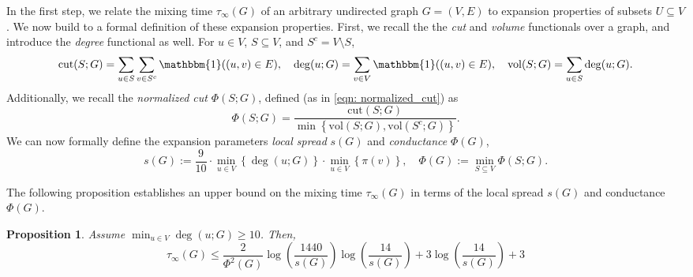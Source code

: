 \documentclass[11pt,twoside]{article}
\newtheorem{proposition}{Proposition}
\theoremstyle{definition}
\newcommand{\set}[1]{\left\{#1\right\}}
\newcommand{\vol}{\mathrm{vol}}
\newcommand{\cut}{\mathrm{cut}}
\newcommand{\1}{\mathbbm{1}}
\begin{document}
In the first step, we relate the mixing time $\tau_{\infty}(G)$ of an arbitrary undirected graph $G = (V,E)$ to expansion properties of subsets $U \subseteq V$. We now build to a formal definition of these expansion properties. First, we recall the the \emph{cut} and \emph{volume} functionals over a graph, and introduce the \emph{degree} functional as well. For $u \in V$, $S \subseteq V$, and $S^c = V \setminus S$,
\begin{equation*}
\cut(S;G) = \sum_{u \in S} \sum_{v \in S^c} \1((u,v) \in E), \quad \deg(u;G) = \sum_{v \in V} \1((u,v) \in E), \quad \vol(S;G) = \sum_{u \in S} \deg(u;G).
\end{equation*}
Additionally, we recall the \emph{normalized cut} $\Phi(S;G)$, defined (as in \eqref{eqn: normalized_cut}) as
\begin{equation*}
\Phi(S;G) = \frac{\cut(S; G)}{\min\set{\vol(S; G),\vol(S^c; G)}}.
\end{equation*}
We can now formally define the expansion parameters \emph{local spread} $s(G)$ and \emph{conductance} $\Phi(G)$,
\begin{equation*}
s(G) := \frac{9}{10} \cdot \min_{u \in V} \set{\deg(u; G)} \cdot \min_{u \in V} \set{\pi(v)}, \quad \Phi(G) := \min_{S \subseteq V} \Phi(S;G).
\end{equation*}

The following proposition establishes an upper bound on the mixing time $\tau_{\infty}(G)$ in terms of the local spread $s(G)$ and conductance $\Phi(G)$.
\begin{proposition}
	\label{prop: pointwise_mixing_time}
	Assume $\min_{u \in V} \deg(u; G) \geq 10$. Then,
	\begin{equation*}
	\tau_{\infty}(G) \leq \frac{2}{\Phi^2(G)} \log \left(\frac{1440}{s(G)}\right)\log \left(\frac{14}{s(G)}\right)  + 3 \log \left(\frac{14}{s(G)}\right) + 3
	\end{equation*}
\end{proposition}
\end{document}
